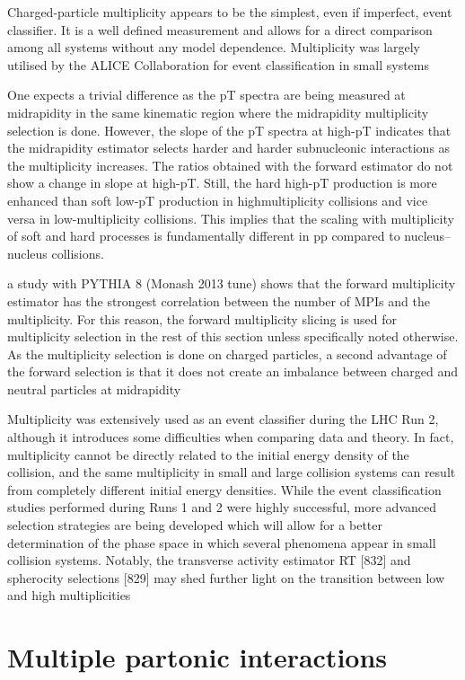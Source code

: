 Charged-particle multiplicity appears to be the simplest, even if imperfect, event
classifier. It is a well defined measurement and allows for a direct comparison among all systems without any model dependence. Multiplicity was largely utilised by the ALICE Collaboration for event
classification in small systems 

One expects a trivial difference as the pT spectra are being measured at midrapidity in the same kinematic region where the midrapidity multiplicity selection is done. However, the slope of the pT spectra
at high-pT indicates that the midrapidity estimator selects harder and harder subnucleonic interactions as
the multiplicity increases. The ratios obtained with the forward estimator do not show a change in slope
at high-pT. Still, the hard high-pT production is more enhanced than soft low-pT production in highmultiplicity collisions and vice versa in low-multiplicity collisions. This implies that the scaling with
multiplicity of soft and hard processes is fundamentally different in pp compared to nucleus–nucleus
collisions.

a study with PYTHIA 8 (Monash 2013 tune) shows that the forward multiplicity estimator has the strongest correlation between the number of MPIs and the multiplicity. For this reason, the
forward multiplicity slicing is used for multiplicity selection in the rest of this section unless specifically noted otherwise. As the multiplicity selection is done on charged particles, a second advantage
of the forward selection is that it does not create an imbalance between charged and neutral particles at
midrapidity

Multiplicity was extensively used as an event classifier during the LHC Run 2, although it introduces
some difficulties when comparing data and theory. In fact, multiplicity cannot be directly related to the
initial energy density of the collision, and the same multiplicity in small and large collision systems can
result from completely different initial energy densities.
While the event classification studies performed during Runs 1 and 2 were highly successful, more
advanced selection strategies are being developed which will allow for a better determination of the phase
space in which several phenomena appear in small collision systems. Notably, the transverse activity
estimator RT [832] and spherocity selections [829] may shed further light on the transition between low
and high multiplicities

\section{Multiple partonic interactions}


